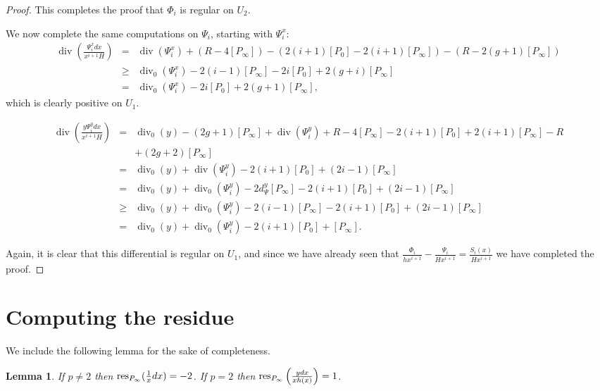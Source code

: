\documentclass[draft, 11pt]{article} %
\theoremstyle{plain}
\newtheorem{lem}[defn]{Lemma}
\theoremstyle{remark}
\DeclareMathOperator{\di}{div}
\begin{document}
\begin{proof}
This completes the proof that $\Phi_i$ is regular on $U_2$.

We now complete the same computations on $\Psi_i$, starting with $\Psi_i^x$:
\begin{eqnarray*}
\di\left( \frac{\Psi_i^x dx}{x^{i+1}H} \right) & = & \di(\Psi_i^x) + (R - 4[P_\infty]) - (2(i+1)[P_0] - 2(i+1)[P_\infty]) - (R - 2(g+1)[P_\infty]) \\
& \geq & \di_0(\Psi_i^x ) - 2(i-1)[P_\infty] - 2i[P_0] + 2(g+i)[P_\infty] \\
& = & \di_0(\Psi_i^x) - 2i[P_0] + 2(g+1)[P_\infty],
\end{eqnarray*}
which is clearly positive on $U_1$.

\begin{eqnarray*}
\di\left(\frac{y\Psi_i^y dx}{x^{i+1}H} \right) & = & \di_0(y) - (2g+1)[P_\infty] + \di(\Psi_i^y) + R - 4[P_\infty] -2(i+1)[P_0] + 2(i+1)[P_\infty] - R \\
& & + (2g+2)[P_\infty] \\
& = & \di_0(y) + \di(\Psi_i^y) -2(i+1)[P_0] + (2i -1)[P_\infty] \\
& = & \di_0(y) + \di_0(\Psi_i^y) - 2d_\Psi^y[P_\infty] - 2(i+1)[P_0] + (2i-1)[P_\infty] \\
& \geq & \di_0(y) + \di_0(\Psi_i^y) -2(i-1)[P_\infty] -2(i+1)[P_0] + (2i-1)[P_\infty] \\
& = & \di_0(y) + \di_0(\Psi_i^y) -2(i+1)[P_0] + [P_\infty].
\end{eqnarray*}



Again, it is clear that this differential is regular on $U_1$, and since we have already seen that $\frac{\Phi_i}{hx^{i+1}} - \frac{\Psi_i}{Hx^{i+1}} = \frac{S_i(x)}{Hx^{i+1}}$ we have completed the proof.



\end{proof}

\section{Computing the residue}

We include the following lemma for the sake of completeness.

\begin{lem}
If $p \neq 2$ then ${\rm res}_{P_\infty}(\frac{1}{x}dx) = -2$.
If $p=2$ then ${\rm res}_{P_\infty}\left(\frac{ydx}{xh(x)}\right) = 1$.
\end{lem}
\end{document}
